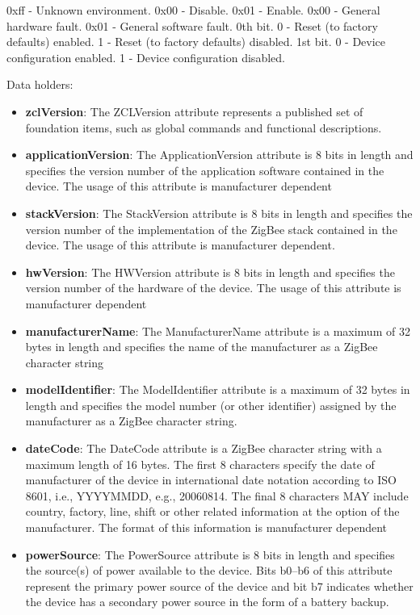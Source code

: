				0xff - Unknown environment. 				0x00 - Disable. 				0x01 - Enable. 				0x00 - General hardware fault. 				0x01 - General software fault. 				0th bit. 				 0 - Reset (to factory defaults) enabled. 				 1 - Reset (to factory defaults) disabled. 				1st bit. 				 0 - Device configuration enabled. 				 1 - Device configuration disabled.
\newline

\noindent
Data holders:

\begin{itemize}
\item \textbf{zclVersion}: The ZCLVersion attribute represents a published set of foundation items, such as global commands and functional descriptions.
\item \textbf{applicationVersion}: The ApplicationVersion attribute is 8 bits in length and specifies the version number of the application software contained in the device. The usage of this attribute is manufacturer dependent
\item \textbf{stackVersion}: The StackVersion attribute is 8 bits in length and specifies the version number of the implementation of the ZigBee stack contained in the device. The usage of this attribute is manufacturer dependent.
\item \textbf{hwVersion}: The HWVersion attribute is 8 bits in length and specifies the version number of the hardware of the device. The usage of this attribute is manufacturer dependent
\item \textbf{manufacturerName}: The ManufacturerName attribute is a maximum of 32 bytes in length and specifies the name of the manufacturer as a ZigBee character string
\item \textbf{modelIdentifier}: The ModelIdentifier attribute is a maximum of 32 bytes in length and specifies the model number (or other identifier) assigned by the manufacturer as a ZigBee character string.
\item \textbf{dateCode}: The DateCode attribute is a ZigBee character string with a maximum length of 16 bytes. The first 8 characters specify the date of manufacturer of the device in international date notation according to ISO 8601, i.e., YYYYMMDD, e.g., 20060814. The final 8 characters MAY include country, factory, line, shift or other related information at the option of the manufacturer. The format of this information is manufacturer dependent
\item \textbf{powerSource}: The PowerSource attribute is 8 bits in length and specifies the source(s) of power available to the device. Bits b0–b6 of this attribute represent the primary power source of the device and bit b7 indicates whether the device has a secondary power source in the form of a battery backup.

\end{itemize}

